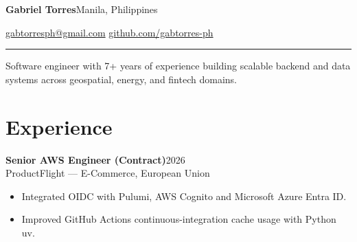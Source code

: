 \documentclass[10pt,a4paper]{article}
\begin{document}
{\LARGE\bfseries Gabriel Torres}\hfill Manila, Philippines

\href{mailto:gabtorresph@gmail.com}{gabtorresph@gmail.com}\hfill
\href{https://github.com/gabtorres-ph}{github.com/gabtorres-ph}

\vspace{0.5em}
\hrule
\vspace{0.5em}

Software engineer with 7+ years of experience building scalable backend and
data systems across geospatial, energy, and fintech domains.

\section*{Experience}

\textbf{Senior AWS Engineer (Contract)}\hfill 2026\\
\textcolor{accent}{ProductFlight} --- E-Commerce, European Union

\begin{itemize}
  \item Integrated OIDC with Pulumi, AWS Cognito and Microsoft Azure Entra ID.
  \item Improved GitHub Actions continuous-integration cache usage with Python uv.
\end{itemize}
\end{document}
